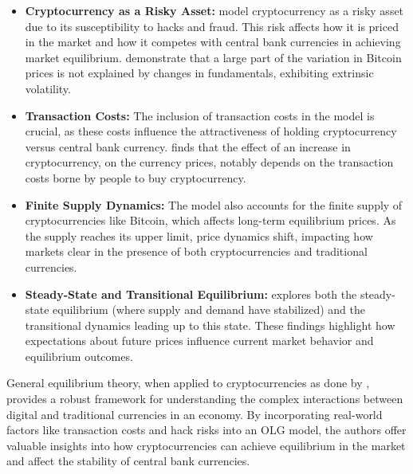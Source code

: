     \begin{itemize}
        \item \textbf{Cryptocurrency as a Risky Asset:}  model cryptocurrency as a risky asset due to its susceptibility to hacks and fraud. This risk affects how it is priced in the market and how it competes with central bank currencies in achieving market equilibrium.  demonstrate that a large part of the variation in Bitcoin prices is not explained by changes in fundamentals, exhibiting extrinsic volatility.
        \item \textbf{Transaction Costs:} The inclusion of transaction costs in the model is crucial, as these costs influence the attractiveness of holding cryptocurrency versus central bank currency.  finds that the effect of an increase in cryptocurrency, on the currency prices, notably depends on the transaction costs borne by people to buy cryptocurrency.
        \item \textbf{Finite Supply Dynamics:} The model also accounts for the finite supply of cryptocurrencies like Bitcoin, which affects long-term equilibrium prices. As the supply reaches its upper limit, price dynamics shift, impacting how markets clear in the presence of both cryptocurrencies and traditional currencies.
        \item \textbf{Steady-State and Transitional Equilibrium:}  explores both the steady-state equilibrium (where supply and demand have stabilized) and the transitional dynamics leading up to this state. These findings highlight how expectations about future prices influence current market behavior and equilibrium outcomes.
    \end{itemize}

General equilibrium theory, when applied to cryptocurrencies as done by , provides a robust framework for understanding the complex interactions between digital and traditional currencies in an economy. By incorporating real-world factors like transaction costs and hack risks into an OLG model, the authors offer valuable insights into how cryptocurrencies can achieve equilibrium in the market and affect the stability of central bank currencies. 
